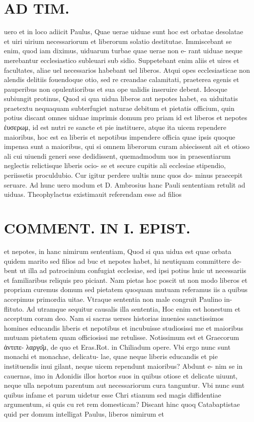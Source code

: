 \documentclass{article}
\begin{document}
\begin{pages}
\section*{AD TIM. }
\marginpar{[ p.149 ]}\pstart uero et in loco adiicit Paulus, Quae uerae uiduae sunt hoc est orbatae desolatae et uiri uirium necessariorum et liberorum solatio destitutae. Immiscebant se enim, quod iam diximus, uiduarum turbae quae uerae non e- rant uiduae neque merebantur ecclesiastico subleuari sub sidio. Suppetebant enim aliis et uires et facultates, aliae uel necessarios habebant uel liberos. Atqui opes ecclesiasticae non alendis delitiis fouendoque otio, sed re creandae calamitati, praeterea egenis et pauperibus non opulentioribus et sua ope ualidis inseruire debent. Ideoque subiungit protinus, Quod si qua uidua liberos aut nepotes habet, ea uiduitatis praetextu nequaquam subterfugiet naturae debitum et pietatis officium, quin potius discant omnes uiduae imprimis domum pro priam id est liberos et nepotes ἐυσερωμ, id est nutri re sancte et pie instituere, atque ita uicem rependere maioribus, hoc est ea liberis et nepotibus impendere officia quae ipsis quoque impensa sunt a maioribus, qui si omnem liberorum curam abiecissent ait et otioso ali cui uiuendi generi sese dedidissent, quemadmodum uos in praesentiarum neglectis relictisque liberis ocio- se et secure cupitis ali ecclesiae stipendio, periissetis proculdubio. Cur igitur perdere uultis nunc quos do- minus praecepit seruare. Ad hunc uero modum et D. Ambrosius hanc Pauli sententiam retulit ad uiduas. Theophylactus existimauit referendam esse ad filios  \pend
\section*{COMMENT. IN I. EPIST. }\pstart et nepotes, in hanc nimirum sententiam, Quod si qua uidua est quae orbata quidem marito sed filios ad buc et nepotes habet, hi neutiquam committere de- bent ut illa ad patrocinium confugiat ecclesiae, sed ipsi potius huic ut necessariis et familiaribus reliquis pro piciant. Nam pietas hoc poscit ut non modo liberos et propriam curemus domum sed pietatem quoquam mutuam referamus iis a quibus accepimus primordia uitae. Vtraque sententia non male congruit Paulino in- flituto. Ad utramque sequitur causalis illa sententia, Hoc enim est honestum et acceptum coram deo. Nam si sacras uerses historias inuenies sanctissimos homines educandis liberis et nepotibus et incubuisse studiosissi me et maioribus mutuam pietatem quam officiosissi me retulisse. Notissimum est et Graecorum ἀντιπε- λαργο͂μ, de quo et Eras.Rot. in Chiliadum opere. Vbi ergo nunc sunt monachi et monachae, delicatu- lae, quae neque liberis educandis et pie instituendis inui gilant, neque uicem rependunt maioribus? Abdunt e- nim se in cauernas, imo in Adonidis illos hortos suos in quibus otiose et delicate uiuunt, neque ulla nepotum parentum aut necessariorum cura tanguntur. Vbi nunc sunt quibus infame et parum uidetur esse Chri stianum sed magis diffidentiae argumentum, si quis cu ret rem domesticam? Discant hinc quoq Catabaptistae quid per domum intelligat Paulus, liberos nimirum et  \pend

\end{pages}
\end{document}
